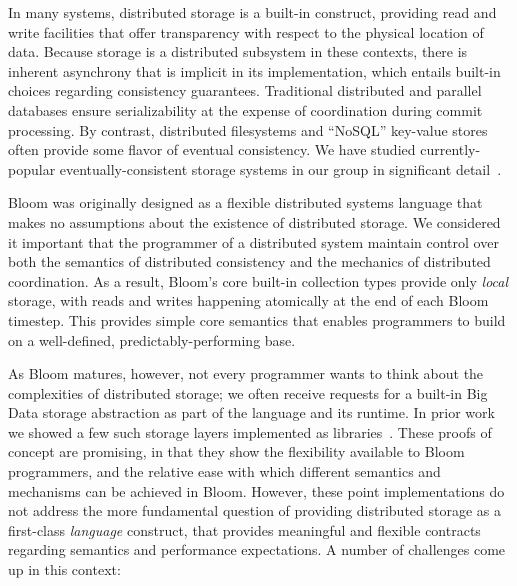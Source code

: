 In many systems, distributed storage is a built-in construct, providing read and write facilities that offer transparency with respect to the physical location of data.  Because storage is a distributed subsystem in these contexts, there is inherent asynchrony that is implicit in its implementation, which  entails built-in choices regarding consistency guarantees. Traditional distributed and parallel databases ensure serializability at the expense of coordination during commit processing.  By contrast, distributed filesystems and ``NoSQL'' key-value stores often provide some flavor of eventual consistency.  We have studied currently-popular eventually-consistent storage systems in our group in significant detail~\cite{boom-eurosys,bailis}.

Bloom was originally designed as a flexible distributed systems language that makes no assumptions about the existence of distributed storage.  We considered it important that the  programmer of a distributed system maintain control over both the semantics of distributed consistency and the mechanics of distributed coordination.  As a result, Bloom's core built-in collection types provide only \emph{local} storage, with reads and writes happening atomically at the end of each Bloom timestep.  This provides simple core semantics that enables programmers to build on a well-defined, predictably-performing base.

As Bloom matures, however, not every programmer wants to think about the complexities of distributed storage; we often receive requests for a built-in Big Data storage abstraction as part of the language and its runtime.  In prior work we showed a few such storage layers implemented as libraries~\cite{boom-eurosys,bud-sandbox}.  These proofs of concept are promising, in that they show the flexibility available to Bloom programmers, and the relative ease with which different semantics and mechanisms can be achieved in Bloom.  However, these point implementations do not address the more fundamental question of providing distributed storage as a first-class \emph{language} construct, that provides meaningful and flexible contracts regarding semantics and performance expectations.   A number of challenges come up in this context:

